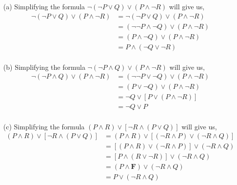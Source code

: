 \documentclass{article} %
\begin{document}
\begin{enumerate}
    \begin{itemize}
        \item[(a)] Simplifying the formula $\neg (\neg P \lor Q) \lor (P \land \neg R)$ will give us,
        \begin{equation*}
            \begin{split}
                \neg (\neg P \lor Q) \lor (P \land \neg R) & = \neg (\neg P \lor Q) \lor (P \land \neg R) \\
                & = (\neg \neg P \land \neg Q) \lor (P \land \neg R) \\
                & = (P \land \neg Q) \lor (P \land \neg R) \\
                & = P \land (\neg Q \lor \neg R) \\
            \end{split}
        \end{equation*}
        \item[(b)] Simplifying the formula $\neg (\neg P \land Q) \lor (P \land \neg R)$ will give us,
        \begin{equation*}
            \begin{split}
                \neg (\neg P \land Q) \lor (P \land \neg R) & = (\neg \neg P \lor \neg Q) \lor (P \land \neg R) \\
                & = (P \lor \neg Q) \lor (P \land \neg R) \\
                & = \neg Q \lor [P \lor (P \land \neg R)] \\
                & = \neg Q \lor P \\
            \end{split}
        \end{equation*}
        \item[(c)] Simplifying the formula $(P \land R) \lor [\neg R \land (P \lor Q)]$ will give us,
        \begin{equation*}
            \begin{split}
                (P \land R) \lor [\neg R \land (P \lor Q)] & = (P \land R) \lor [(\neg R \land P) \lor (\neg R \land Q)] \\
                & = [(P \land R) \lor (\neg R \land P)] \lor (\neg R \land Q) \\
                & = [P \land (R \lor \neg R)] \lor (\neg R \land Q) \\
                & = (P \land \textbf{F}) \lor (\neg R \land Q) \\
                & = P \lor (\neg R \land Q) \\
            \end{split}
        \end{equation*}


\end{itemize}
\end{enumerate}
\end{document}
